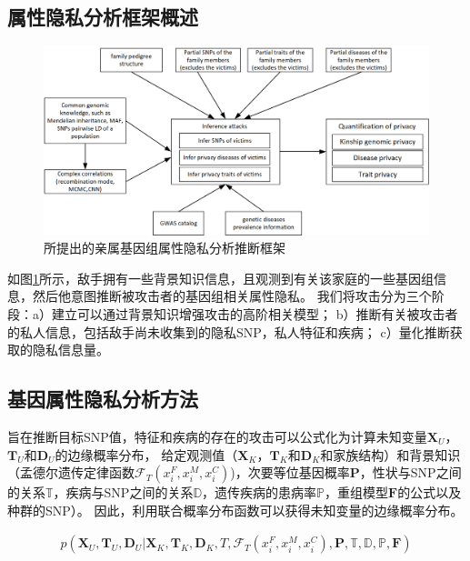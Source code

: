 \subsection{属性隐私分析框架概述}

\begin{figure}[htbp]
	\centering
	\includegraphics[width=0.95\linewidth]{./figures/attack-framework.png}
	\centering
	\caption{所提出的亲属基因组属性隐私分析推断框架}\label{fig:attack-framework}
\end{figure}

如图\ref{fig:attack-framework}所示，敌手拥有一些背景知识信息，且观测到有关该家庭的一些基因组信息，然后他意图推断被攻击者的基因组相关属性隐私。 我们将攻击分为三个阶段：a）建立可以通过背景知识增强攻击的高阶相关模型； b）推断有关被攻击者的私人信息，包括敌手尚未收集到的隐私SNP，私人特征和疾病； c）量化推断获取的隐私信息量。

\subsection{基因属性隐私分析方法}
旨在推断目标SNP值，特征和疾病的存在的攻击可以公式化为计算未知变量$\mathbf{X}_U$，$\mathbf{T}_U$和$\mathbf{D}_U$的边缘概率分布，
给定观测值（$\mathbf{X}_K$，$\mathbf{T}_K$和$\mathbf{D}_K$和家族结构）和背景知识（孟德尔遗传定律函数$\mathcal{F}_T(x_i^F,x_i^M,x_i^C)$)，次要等位基因概率$\mathbf{P}$，性状与SNP之间的关系$\mathbb{T}$，疾病与SNP之间的关系$\mathbb{D}$，遗传疾病的患病率$\mathbb{P}$，重组模型$\mathbf{F}$的公式以及种群的SNP）。 因此，利用联合概率分布函数可以获得未知变量的边缘概率分布。

\begin{equation}\label{eq:joint-pro}
\begin{aligned}
p(\mathbf{X}_U, \mathbf{T}_U, \mathbf{D}_U | \mathbf{X}_K, \mathbf{T}_K, \mathbf{D}_K, T, \mathcal{F}_T(x_i^F,x_i^M,x_i^C), \mathbf{P}, \mathbb{T}, \mathbb{D}, \mathbb{P}, \mathbf{F})
\end{aligned}
\end{equation}

